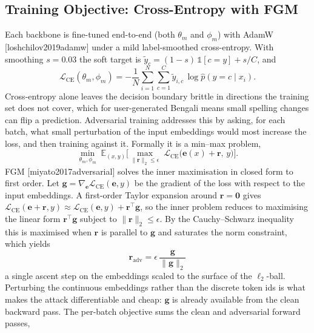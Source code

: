 \documentclass[11pt,a4paper]{article}
\def\citep#1{[#1]}%
\begin{document}
\subsection{Training Objective: Cross-Entropy with FGM}
\label{sec:objective}

Each backbone is fine-tuned end-to-end (both $\theta_m$ and $\phi_m$) with AdamW \citep{loshchilov2019adamw} under a mild label-smoothed cross-entropy. With smoothing $s = 0.03$ the soft target is $\tilde{y}_c = (1-s)\,\mathbb{1}[c = y] + s/C$, and
\begin{equation}
\mathcal{L}_{\mathrm{CE}}(\theta_m, \phi_m) = -\frac{1}{N}\sum_{i=1}^{N}\sum_{c=1}^{C} \tilde{y}_{i,c}\,\log \hat{p}(y = c \mid x_i).
\label{eq:ce}
\end{equation}
Cross-entropy alone leaves the decision boundary brittle in directions the training set does not cover, which for user-generated Bengali means small spelling changes can flip a prediction. Adversarial training addresses this by asking, for each batch, what small perturbation of the input embeddings would most increase the loss, and then training against it. Formally it is a min--max problem,
\begin{equation}
\min_{\theta_m, \phi_m}\; \mathbb{E}_{(x,y)}\Big[\max_{\|\mathbf{r}\|_2 \le \epsilon}\; \mathcal{L}_{\mathrm{CE}}\big(\mathbf{e}(x) + \mathbf{r},\, y\big)\Big].
\label{eq:minmax}
\end{equation}
FGM \citep{miyato2017adversarial} solves the inner maximisation in closed form to first order. Let $\mathbf{g} = \nabla_{\mathbf{e}}\mathcal{L}_{\mathrm{CE}}(\mathbf{e},y)$ be the gradient of the loss with respect to the input embeddings. A first-order Taylor expansion around $\mathbf{r} = \mathbf{0}$ gives $\mathcal{L}_{\mathrm{CE}}(\mathbf{e} + \mathbf{r}, y) \approx \mathcal{L}_{\mathrm{CE}}(\mathbf{e}, y) + \mathbf{r}^{\top}\mathbf{g}$, so the inner problem reduces to maximising the linear form $\mathbf{r}^{\top}\mathbf{g}$ subject to $\|\mathbf{r}\|_2 \le \epsilon$. By the Cauchy--Schwarz inequality this is maximised when $\mathbf{r}$ is parallel to $\mathbf{g}$ and saturates the norm constraint, which yields
\begin{equation}
\boxed{\;\mathbf{r}_{\mathrm{adv}} = \epsilon\,\frac{\mathbf{g}}{\|\mathbf{g}\|_2}\;}
\label{eq:fgm}
\end{equation}
a single ascent step on the embeddings scaled to the surface of the $\ell_2$-ball. Perturbing the continuous embeddings rather than the discrete token ids is what makes the attack differentiable and cheap: $\mathbf{g}$ is already available from the clean backward pass. The per-batch objective sums the clean and adversarial forward passes,
\end{document}
